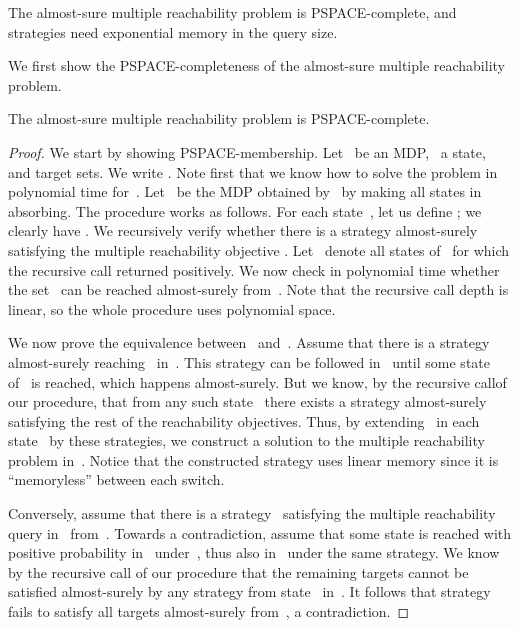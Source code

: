 \documentclass{llncs}
\newcommand\PSPACE{\textrm{\sf PSPACE}}
\begin{document}
\begin{theorem}
  \label{thm:asreach}
  The almost-sure multiple reachability problem is \PSPACE-complete,
  and strategies need exponential memory in the query size.
\end{theorem}

We first show the \PSPACE-completeness of the almost-sure multiple reachability problem.

\begin{lemma}
  The almost-sure multiple reachability problem is \PSPACE-complete.
\end{lemma}

\begin{proof}
  We start by showing \PSPACE-membership. Let~ be an MDP,~ a state, and  target sets. We write
  . Note first that we know how to solve the problem in polynomial time for~.
  Let~ be the MDP obtained by~ by making all states in~ absorbing. The procedure works as follows. For each state~,
  let us define ; we clearly have .
  We recursively verify whether there is a strategy almost-surely satisfying the multiple reachability objective .
  Let~ denote all states of~ for which the recursive call returned positively. We now check in polynomial time whether
  the set~ can be reached almost-surely from~.
  Note that the recursive call depth is linear, so the whole procedure uses polynomial space.

  We now prove the equivalence between~ and~. Assume that there is a strategy~ almost-surely reaching~ in~.
  This strategy can be followed in~ until some state~ of~ is reached, which happens almost-surely. But we know, by the recursive callof our procedure, that from any such state~ there exists a strategy almost-surely satisfying the rest of the reachability objectives.
  Thus, by extending~ in each state~ by these strategies, we construct a solution to the multiple reachability problem in~. Notice that the constructed strategy uses linear memory since it is ``memoryless'' between each switch.

  Conversely, assume that there is a strategy~ satisfying the multiple reachability query in~ from~.
  Towards a contradiction, assume that some state  is reached with positive probability in~ under~, 
  thus also in~ under the same strategy. We know by the recursive call of our procedure that the remaining targets cannot be satisfied 
  almost-surely by any strategy from state~ in~. It follows that strategy  fails to satisfy all targets almost-surely 
  from~, a contradiction.
  

\end{proof}
\end{document}
